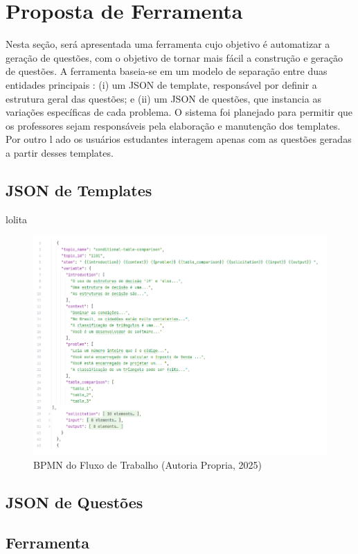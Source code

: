 \chapter{Proposta de Ferramenta}

Nesta seção, será apresentada uma ferramenta cujo objetivo é automatizar a geração de questões, com o objetivo de tornar mais fácil a construção e geração de questões. A ferramenta baseia-se em um modelo de separação entre duas entidades principais : (i) um JSON de template, responsável por definir a estrutura geral das questões; e (ii) um JSON de questões, que instancia as variações específicas de cada problema. O sistema foi planejado para permitir que os professores sejam responsáveis pela elaboração e manutenção dos templates. Por outro l ado os usuários estudantes interagem apenas com as questões geradas a partir desses templates.

\section{JSON de Templates}

lolita

\begin{figure}[ht]
	\centering
	\includegraphics[width=14cm]{./imagens/capitulo7/json-de-template}
	\caption{BPMN do Fluxo de Trabalho (Autoria Propria, 2025) }
	\label{fig:bpmn-fluxo}
\end{figure}
\section{JSON de Questões}


\section{Ferramenta}